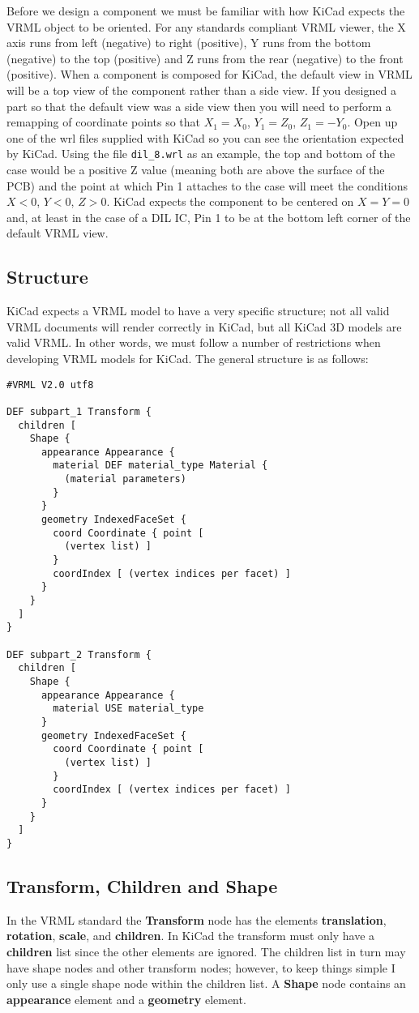 \documentclass[a4paper]{article}
\begin{document}
Before we design a component we must be familiar with how KiCad expects the VRML object to be oriented. For any
standards compliant VRML viewer, the X axis runs from left (negative) to right (positive), Y runs from the
bottom (negative) to the top (positive) and Z runs from the rear (negative) to the front (positive). When a
component is composed for KiCad, the default view in VRML will be a top view of the component rather than a
side view. If you designed a part so that the default view was a side view then you will need to perform a
remapping of coordinate points so that $X_1=X_0$, $Y_1=Z_0$, $Z_1=-Y_0$. Open up one of the wrl files supplied with KiCad so you
can see the orientation expected by KiCad. Using the file \verb~dil_8.wrl~ as an example, the top and
bottom of the case would be a positive Z value (meaning both are above the surface of the PCB) and the point at
which Pin 1 attaches to the case will meet the conditions $X<0$, $Y<0$, $Z>0$. KiCad expects the component to be centered
on $X=Y=0$ and, at least in the case of a DIL IC, Pin 1 to be at the bottom left corner of the default VRML view.

\subsection{Structure}
KiCad expects a VRML model to have a very specific structure; not all valid VRML documents will render
correctly in KiCad, but all KiCad 3D models are valid VRML.  In other words, we must follow a number of
restrictions when developing VRML models for KiCad. The general structure is as follows:

\begin{verbatim}
#VRML V2.0 utf8

DEF subpart_1 Transform {
  children [
    Shape {
      appearance Appearance {
        material DEF material_type Material {
          (material parameters)
        }
      }
      geometry IndexedFaceSet {
        coord Coordinate { point [
          (vertex list) ]
        }
        coordIndex [ (vertex indices per facet) ]
      }
    }
  ]
}

DEF subpart_2 Transform {
  children [
    Shape {
      appearance Appearance {
        material USE material_type
      }
      geometry IndexedFaceSet {
        coord Coordinate { point [
          (vertex list) ]
        }
        coordIndex [ (vertex indices per facet) ]
      }
    }
  ]
}
\end{verbatim}

\subsection{Transform, Children and Shape}
In the VRML standard the \textbf{Transform} node has the elements \textbf{translation},
\textbf{rotation}, \textbf{scale}, and \textbf{children}. In KiCad the transform must only
have a \textbf{children} list since the other elements are ignored.
The children list in turn may have shape nodes and other
transform nodes; however, to keep things simple I only use a single shape node within
the children list. A \textbf{Shape} node contains an \textbf{appearance} element and a
\textbf{geometry} element.
\end{document}
